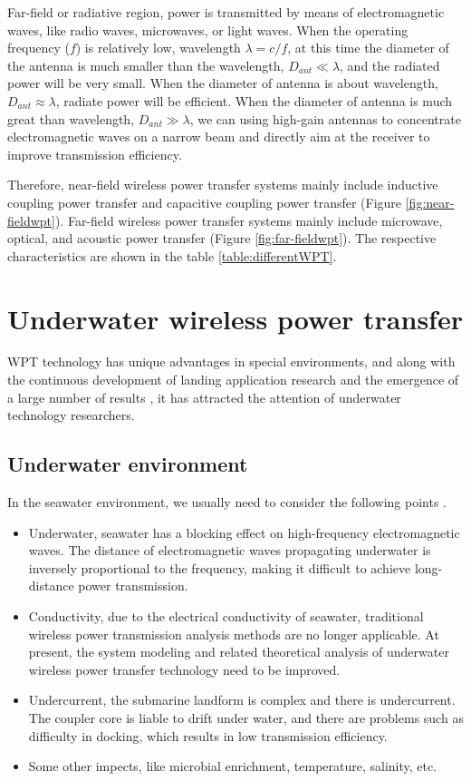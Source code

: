Far-field or radiative region, power is transmitted by means of electromagnetic waves, like radio waves, microwaves, or light waves. When the operating frequency ($f$) is relatively low, wavelength $\lambda = c/f$, at this time the diameter of the antenna is much smaller than the wavelength, $D_{ant} \ll \lambda$, and the radiated power will be very small. When the diameter of antenna is about wavelength, $D_{ant} \approx \lambda$, radiate power will be efficient. When the diameter of antenna is much great than wavelength, $D_{ant} \gg \lambda$, we can using high-gain antennas to concentrate electromagnetic waves on a narrow beam and directly aim at the receiver to improve transmission efficiency.


Therefore, near-field wireless power transfer systems mainly include inductive coupling power transfer and capacitive coupling power transfer (Figure \ref{fig:near-fieldwpt}). Far-field wireless power transfer systems mainly include microwave, optical, and acoustic power transfer (Figure \ref{fig:far-fieldwpt}).  The respective characteristics are shown in the table \ref{table:differentWPT}.


\section{Underwater wireless power transfer}
WPT technology has unique advantages in special environments, and along with the continuous development of landing application research and the emergence of a large number of results \cite{Zhang2019}, it has attracted the attention of underwater technology researchers. 
\subsection{Underwater environment}
In the seawater environment, we usually need to consider the following points \cite{Shaw2006, Orekan}.

\begin{itemize}
    \item Underwater, seawater has a blocking effect on high-frequency electromagnetic waves. The distance of electromagnetic waves propagating underwater is inversely proportional to the frequency, making it difficult to achieve long-distance power transmission.
    \item Conductivity, due to the electrical conductivity of seawater, traditional wireless power transmission analysis methods are no longer applicable. At present, the system modeling and related theoretical analysis of underwater wireless power transfer technology need to be improved.
    \item Undercurrent, the submarine landform is complex and there is undercurrent. The coupler core is liable to drift under water, and there are problems such as difficulty in docking, which results in low transmission efficiency.
    \item Some other impects, like microbial enrichment, temperature, salinity, etc.
    
\end{itemize}

